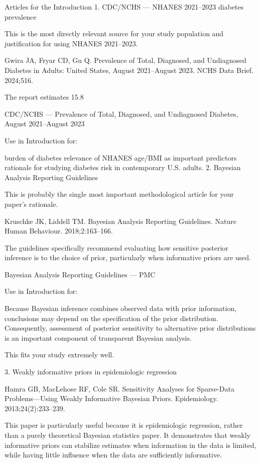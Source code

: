 Articles for the Introduction
1. CDC/NCHS — NHANES 2021–2023 diabetes prevalence

This is the most directly relevant source for your study population and justification for using NHANES 2021–2023.

Gwira JA, Fryar CD, Gu Q. Prevalence of Total, Diagnosed, and Undiagnosed Diabetes in Adults: United States, August 2021–August 2023. NCHS Data Brief. 2024;516.

The report estimates 15.8%

CDC/NCHS — Prevalence of Total, Diagnosed, and Undiagnosed Diabetes, August 2021–August 2023

Use in Introduction for:

burden of diabetes
relevance of NHANES
age/BMI as important predictors
rationale for studying diabetes risk in contemporary U.S. adults.
2. Bayesian Analysis Reporting Guidelines

This is probably the single most important methodological article for your paper's rationale.

Kruschke JK, Liddell TM. Bayesian Analysis Reporting Guidelines. Nature Human Behaviour. 2018;2:163–166.

The guidelines specifically recommend evaluating how sensitive posterior inference is to the choice of prior, particularly when informative priors are used.

Bayesian Analysis Reporting Guidelines — PMC

Use in Introduction for:

Because Bayesian inference combines observed data with prior information, conclusions may depend on the specification of the prior distribution. Consequently, assessment of posterior sensitivity to alternative prior distributions is an important component of transparent Bayesian analysis.

This fits your study extremely well.

3. Weakly informative priors in epidemiologic regression

Hamra GB, MacLehose RF, Cole SR. Sensitivity Analyses for Sparse-Data Problems—Using Weakly Informative Bayesian Priors. Epidemiology. 2013;24(2):233–239.

This paper is particularly useful because it is epidemiologic regression, rather than a purely theoretical Bayesian statistics paper. It demonstrates that weakly informative priors can stabilize estimates when information in the data is limited, while having little influence when the data are sufficiently informative.

